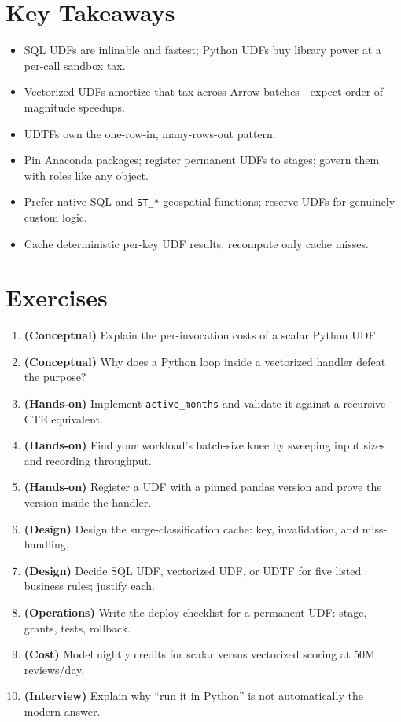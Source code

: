 \section*{Key Takeaways}
\begin{itemize}
    \item SQL UDFs are inlinable and fastest; Python UDFs buy library power at a per-call sandbox tax.
    \item Vectorized UDFs amortize that tax across Arrow batches---expect order-of-magnitude speedups.
    \item UDTFs own the one-row-in, many-rows-out pattern.
    \item Pin Anaconda packages; register permanent UDFs to stages; govern them with roles like any object.
    \item Prefer native SQL and \texttt{ST\_*} geospatial functions; reserve UDFs for genuinely custom logic.
    \item Cache deterministic per-key UDF results; recompute only cache misses.
\end{itemize}

\section{Exercises}
\begin{enumerate}
    \item \textbf{(Conceptual)} Explain the per-invocation costs of a scalar Python UDF.
    \item \textbf{(Conceptual)} Why does a Python loop inside a vectorized handler defeat the purpose?
    \item \textbf{(Hands-on)} Implement \texttt{active\_months} and validate it against a recursive-CTE equivalent.
    \item \textbf{(Hands-on)} Find your workload's batch-size knee by sweeping input sizes and recording throughput.
    \item \textbf{(Hands-on)} Register a UDF with a pinned pandas version and prove the version inside the handler.
    \item \textbf{(Design)} Design the surge-classification cache: key, invalidation, and miss-handling.
    \item \textbf{(Design)} Decide SQL UDF, vectorized UDF, or UDTF for five listed business rules; justify each.
    \item \textbf{(Operations)} Write the deploy checklist for a permanent UDF: stage, grants, tests, rollback.
    \item \textbf{(Cost)} Model nightly credits for scalar versus vectorized scoring at 50M reviews/day.
    \item \textbf{(Interview)} Explain why ``run it in Python'' is not automatically the modern answer.
\end{enumerate}
